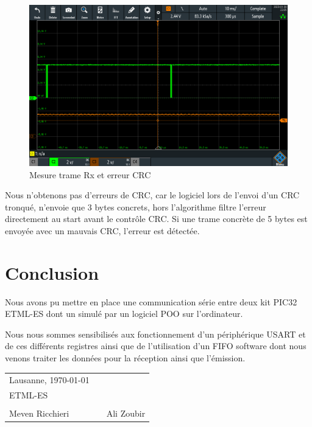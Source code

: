 {{		\begin{figure}[h!]
			\centering
			\includegraphics[width=0.55\linewidth]{MesureRxErrCRC}
			\caption{Mesure trame Rx et erreur CRC}
			\label{fig:mesurerxerrcrc}
		\end{figure}
		Nous n'obtenons pas d'erreurs de CRC, car le logiciel lors de l'envoi d'un CRC tronqué, n'envoie que 3 bytes concrets, hors l'algorithme filtre l'erreur directement au start avant le contrôle CRC. Si une trame concrète de 5 bytes est envoyée avec un mauvais CRC, l'erreur est détectée.
		
	}    
}

\clearpage
\section{Conclusion}
{
	Nous avons pu mettre en place une communication série entre deux kit PIC32 ETML-ES dont un simulé par un logiciel POO sur l'ordinateur. 
	
	Nous nous sommes sensibilisés aux fonctionnement d'un périphérique USART et de ces différents registres ainsi que de l'utilisation d'un FIFO software dont nous venons traiter les données pour la réception ainsi que l'émission. 
	
	\vspace{125mm}
	\begin{tabular}{@{}p{2.5in}p{2in}p{2in}@{}}
		Lausanne, \today\\
		ETML-ES \vspace{+20mm}\\
		\hrulefill && \hrulefill\\
		Meven Ricchieri && Ali Zoubir\\
	\end{tabular}
}